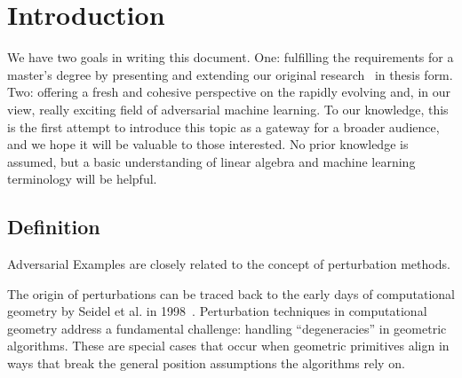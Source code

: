 \documentclass[a4paper, oneside]{discothesis}
\begin{document}
\begin{abstract}
	...
\end{abstract}

\tableofcontents

\mainmatter %

\chapter{Introduction}


We have two goals in writing this document. One: fulfilling the requirements for a master's degree by presenting and extending our original research~\cite{jabary2024seeing} in thesis form. Two: offering a fresh and cohesive perspective on the rapidly evolving and, in our view, really exciting field of adversarial machine learning. To our knowledge, this is the first attempt to introduce this topic as a gateway for a broader audience, and we hope it will be valuable to those interested. No prior knowledge is assumed, but a basic understanding of linear algebra and machine learning terminology will be helpful.

\section{Definition}

Adversarial Examples are closely related to the concept of perturbation methods.

The origin of perturbations can be traced back to the early days of computational geometry by Seidel et al. in 1998~\cite{seidel1998nature}. Perturbation techniques in computational geometry address a fundamental challenge: handling ``degeneracies'' in geometric algorithms. These are special cases that occur when geometric primitives align in ways that break the general position assumptions the algorithms rely on.
\end{document}
